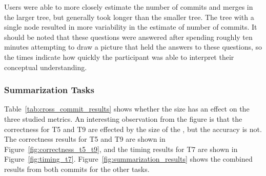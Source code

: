 Users were able to more closely estimate the number of commits and
merges in the larger tree, but generally took longer than the smaller
tree. The tree with a single node resulted in more variability in the
estimate of number of commits. It should be noted that these questions
were answered after spending roughly ten minutes attempting to draw a
picture that held the answers to these questions, so the times indicate
how quickly the participant was able to interpret their conceptual
understanding.

\subsubsection{Summarization Tasks}
\label{sub:summarization_tasks}

Table~\ref{tab:cross_commit_results} shows whether the \mt size has an
effect on the three studied metrics. An interesting observation from the
figure is that the correctness for T5 and T9 are effected by the size of
the \mt, but the accuracy is not. The correctness results for T5 and T9
are shown in Figure~\ref{fig:correctness_t5_t9}, and the timing results
for T7 are shown in Figure~\ref{fig:timing_t7}.
Figure~\ref{fig:summarization_results} shows the combined results from
both commits for the other tasks.

